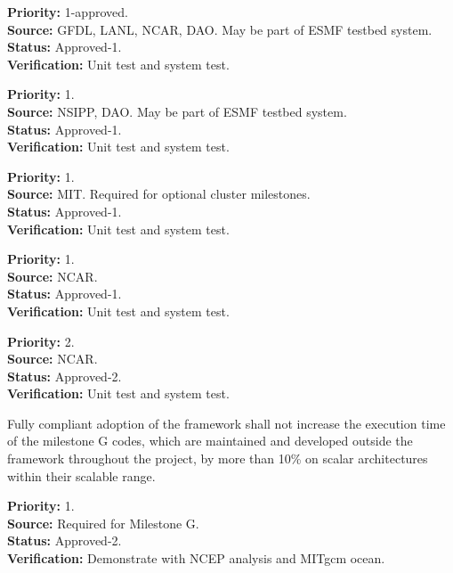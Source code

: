 \begin{reqlist}
{\bf Priority:} 1-approved. \\
{\bf Source:} GFDL, LANL, NCAR, DAO.  May be part of ESMF testbed system. \\
{\bf Status:} Approved-1. \\
{\bf Verification:} Unit test and system test.
\end{reqlist}

\begin{reqlist}
{\bf Priority:} 1. \\
{\bf Source:} NSIPP, DAO.  May be part of ESMF testbed system. \\
{\bf Status:} Approved-1. \\
{\bf Verification:} Unit test and system test.
\end{reqlist}

\begin{reqlist}
{\bf Priority:} 1. \\
{\bf Source:} MIT.  Required for optional cluster milestones. \\
{\bf Status:} Approved-1. \\
{\bf Verification:} Unit test and system test.
\end{reqlist}

\begin{reqlist}
{\bf Priority:} 1. \\
{\bf Source:} NCAR. \\
{\bf Status:} Approved-1. \\
{\bf Verification:} Unit test and system test.
\end{reqlist}

\begin{reqlist}
{\bf Priority:} 2. \\
{\bf Source:} NCAR. \\
{\bf Status:} Approved-2. \\
{\bf Verification:} Unit test and system test.
\end{reqlist}

 \label{perf}
Fully compliant adoption of the framework shall not increase the execution time 
of the milestone G codes, which are maintained and developed outside the 
framework throughout the project, by more than 10\% on scalar 
architectures within their scalable range.
\begin{reqlist}
{\bf Priority:} 1. \\
{\bf Source:} Required for Milestone G. \\
{\bf Status:} Approved-2. \\
{\bf Verification:} Demonstrate with NCEP analysis and MITgcm ocean.
\end{reqlist}

